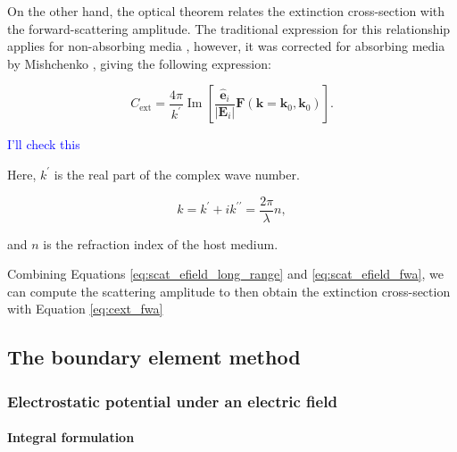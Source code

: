 On the other hand, the optical theorem relates the extinction cross-section with 
the forward-scattering amplitude. 
The traditional expression for this relationship applies for non-absorbing media 
\cite{MayergoyzZhang2007, Jackson}, however, it was corrected for absorbing media 
by Mishchenko \cite{Mishchenko2007}, giving the following expression:

\begin{equation} \label{eq:cext_fwa}
    C_\text{ext} = \frac{4\pi}{k^\prime} \operatorname{Im} \left[ \frac{\mathbf{\hat{e}}_i}{|\mathbf{E}_i|}\mathbf{F}(\mathbf{k}=\mathbf{k}_0, \mathbf{k}_0) \right].
\end{equation}


{\color{red}{Chris in Mishenko 2007 paper the equation is not exactly the same 
(look eq 87 in paper), do you have that derivation? How you got to the eq 7.22 
 in your thesis?.}\textcolor{blue}{I'll check this}}


Here, $k^\prime$ is the real part of the complex wave number. 

\begin{equation}
    k = k^\prime + ik^{\prime\prime} = \frac{2\pi}{\lambda} n,
\end{equation}

and $n$ is the refraction index of the host medium.

Combining Equations \eqref{eq:scat_efield_long_range} and \eqref{eq:scat_efield_fwa},
we can compute the scattering amplitude to then obtain the extinction cross-section 
with Equation \eqref{eq:cext_fwa}


\subsection{The boundary element method} \label{sec:lspr_bem}

\subsubsection{Electrostatic potential under an electric field} \label{sec:pot_elec_field}

\paragraph{Integral formulation}

